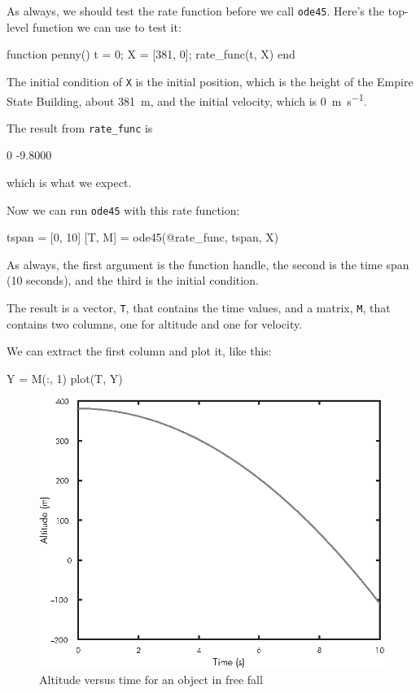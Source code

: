 
As always, we should test the rate function before we call \lstinline{ode45}.  Here's the top-level function we can use to test it:

\begin{code}
function penny()
   t = 0;
   X = [381, 0];
   rate_func(t, X)
end
\end{code}

The initial condition of \lstinline{X} is the initial position, which is the height of the Empire State Building, about \SI{381}{\meter}, and the initial velocity, which is \SI{0}{\meter \per \second}.


The result from \lstinline{rate_func} is

\begin{code}
    0
   -9.8000
\end{code}
which is what we expect.

Now we can run \lstinline{ode45} with this rate function:

\begin{code}
tspan = [0, 10]
[T, M] = ode45(@rate_func, tspan, X)
\end{code}

As always, the first argument is the function handle, the second
is the time span (10 seconds), and the third is the initial
condition.

The result is a vector, \lstinline{T}, that contains the time values, and a matrix, \lstinline{M}, that contains two columns, one for altitude and one for velocity.

We can extract the first column and plot it, like this:

\begin{code}
Y = M(:, 1)
plot(T, Y)
\end{code}


\begin{figure}
\includegraphics{images/figure11_01_new.eps}
\caption{Altitude versus time for an object in free fall}
\label{fig:penny}
\end{figure}


